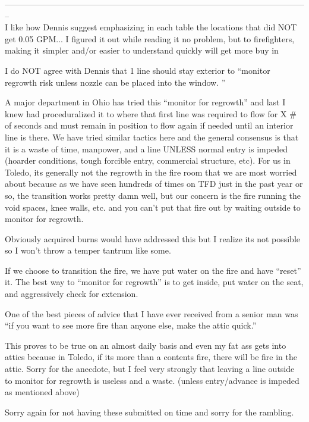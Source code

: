 \documentclass[12pt,oneside]{book}
\begin{document}
\begin{appendix}
-------------------------------------------------------------------------------------------------------------- \\

I like how Dennis suggest emphasizing in each table the locations that did NOT get 0.05 GPM... I figured it out while reading it no problem, but to firefighters, making it simpler and/or easier to understand quickly will get more buy in

I do NOT agree with Dennis that 1 line should stay exterior to ``monitor regrowth risk unless nozzle can be placed into the window.  ''

A major department in Ohio has tried this ``monitor for regrowth'' and last I knew had proceduralized it to where that first line was required to flow for X \# of seconds and must remain in position to flow again if needed until an interior line is there.  We have tried similar tactics here and the general consensus is that it is a waste of time, manpower, and a line UNLESS normal entry is impeded (hoarder conditions, tough forcible entry, commercial structure, etc).  For us in Toledo, its generally not the regrowth in the fire room that we are most worried about because as we have seen hundreds of times on TFD just in the past year or so, the transition works pretty damn well, but our concern is the fire running the void spaces, knee walls, etc. and you can't put that fire out by waiting outside to monitor for regrowth.

Obviously acquired burns would have addressed this but I realize its not possible so I won't throw a temper tantrum like some.

If we choose to transition the fire, we have put water on the fire and have ``reset'' it.  The best way to ``monitor for regrowth'' is to get inside, put water on the seat, and aggressively check for extension.  

One of the best pieces of advice that I have ever received from a senior man was ``if you want to see more fire than anyone else, make the attic quick.''  

This proves to be true on an almost daily basis and even my fat ass gets into attics because in Toledo, if its more than a contents fire, there will be fire in the attic.  Sorry for the anecdote, but I feel very strongly that leaving a line outside to monitor for regrowth is useless and a waste. (unless entry/advance is impeded as mentioned above)


Sorry again for not having these submitted on time and sorry for the rambling.


\end{appendix}
\end{document}

